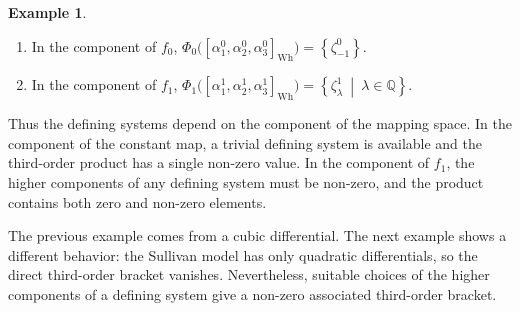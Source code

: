 \documentclass[a4paper,10pt]{amsart}
\theoremstyle{definition}
\newtheorem{ex}[thm]{Example}
\theoremstyle{remark}
\numberwithin{equation}{section}
\begin{document}
\begin{ex}
\begin{enumerate}
\item In the component of $f_0$,
$
\Phi_0
\bigl(
[\alpha_1^0,\alpha_2^0,\alpha_3^0]_{\mathrm{Wh}}
\bigr)
=
\left\{
\zeta_{-1}^0
\right\}.
$

\item In the component of $f_1$,
$
\Phi_1
\bigl(
[\alpha_1^1,\alpha_2^1,\alpha_3^1]_{\mathrm{Wh}}
\bigr)
=
\left\{
\zeta_\lambda^1
\ \middle|\
\lambda\in\mathbb{Q}
\right\}.
$
\end{enumerate}

Thus the defining systems depend on the component of the mapping space.
In the component of the constant map, a trivial defining system is available
and the third-order product has a single non-zero value. 
In the component of $f_1$, the higher components of any defining system must
be non-zero, and the product contains both zero and non-zero elements.
\end{ex}





The previous example comes from a cubic differential. The next example shows
a different behavior: the Sullivan model has only quadratic differentials, so
the direct third-order bracket vanishes. Nevertheless, suitable choices of the
higher components of a defining system give a non-zero associated third-order
bracket.
\end{document}
